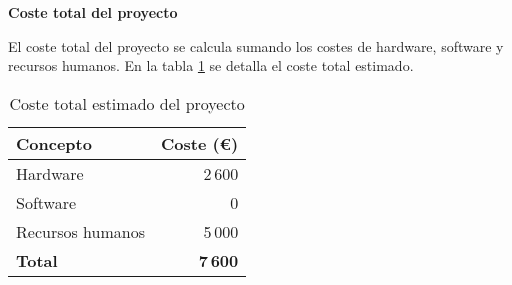\textbf{Coste total del proyecto}

El coste total del proyecto se calcula sumando los costes de hardware, software y recursos humanos. En la tabla \ref{tab:coste-total} se detalla el coste total estimado.

\begin{table}[h!]
    \centering
    \begin{tabular}{|l|r|}
        \hline
        \textbf{Concepto} & \textbf{Coste (€)} \\
        \hline
        Hardware          & 2\,600             \\
        Software          & 0                  \\
        Recursos humanos  & 5\,000             \\
        \hline
        \textbf{Total}    & \textbf{7\,600}    \\
        \hline
    \end{tabular}
    \caption{Coste total estimado del proyecto}
    \label{tab:coste-total}
\end{table}